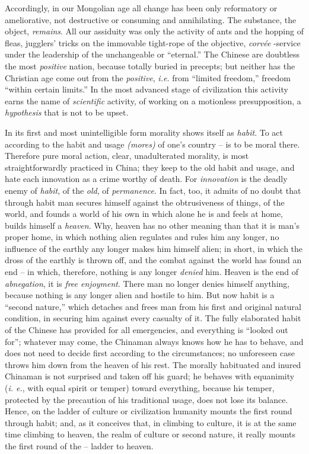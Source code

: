 \documentclass[12pt,a4paper]{book}
\begin{document}
Accordingly, in our Mongolian age all change has been only reformatory or 
ameliorative, not destructive or consuming and annihilating. The substance, 
the object, \textit{remains}. All our assiduity was only the activity of ants 
and the hopping of fleas, jugglers' tricks on the immovable tight-rope of the 
objective, \textit{corv\'ee} -service under the leadership of the unchangeable 
or ``eternal.'' The Chinese are doubtless the most \textit{positive} nation, 
because totally buried in precepts; but neither has the Christian age come out 
from the \textit{positive}, \textit{i.e.} from ``limited freedom,'' freedom 
``within certain limits.'' In the most advanced stage of civilization this 
activity earns the name of \textit{scientific} activity, of working on a 
motionless presupposition, a \textit{hypothesis} that is not to be upset.

In its first and most unintelligible form morality shows itself as 
\textit{habit}. To act according to the habit and usage \textit{(mores)} of 
one's country -- is to be moral there. Therefore pure moral action, clear, 
unadulterated morality, is most straightforwardly practiced in China; they 
keep to the old habit and usage, and hate each innovation as a crime worthy of 
death. For \textit{innovation} is the deadly enemy of \textit{habit}, of the 
\textit{old}, of \textit{permanence}. In fact, too, it admits of no doubt that 
through habit man secures himself against the obtrusiveness of things, of the 
world, and founds a world of his own in which alone he is and feels at home, 
builds himself a \textit{heaven}. Why, heaven has no other meaning than that 
it is man's proper home, in which nothing alien regulates and rules him any 
longer, no influence of the earthly any longer makes him himself alien; in 
short, in which the dross of the earthly is thrown off, and the combat against 
the world has found an end -- in which, therefore, nothing is any longer 
\textit{denied} him. Heaven is the end of \textit{abnegation}, it is 
\textit{free enjoyment}. There man no longer denies himself anything, because 
nothing is any longer alien and hostile to him. But now habit is a ``second 
nature,'' which detaches and frees man from his first and original natural 
condition, in securing him against every casualty of it. The fully elaborated 
habit of the Chinese has provided for all emergencies, and everything is 
``looked out for''; whatever may come, the Chinaman always knows how he has 
to behave, and does not need to decide first according to the circumstances; 
no unforeseen case throws him down from the heaven of his rest. The morally 
habituated and inured Chinaman is not surprised and taken off his guard; he 
behaves with equanimity (\textit{i. e.}, with equal spirit or temper) toward 
everything, because his temper, protected by the precaution of his traditional 
usage, does not lose its balance. Hence, on the ladder of culture or 
civilization humanity mounts the first round through habit; and, as it 
conceives that, in climbing to culture, it is at the same time climbing to 
heaven, the realm of culture or second nature, it really mounts the first 
round of the -- ladder to heaven.
\end{document}
